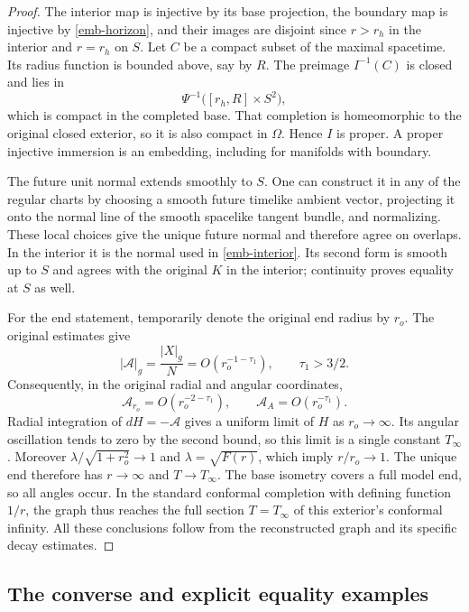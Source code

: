 \begin{proof}
The interior map is injective by its base projection, the boundary
map is injective by \cref{emb-horizon}, and their images are
disjoint since $r>r_h$ in the interior and $r=r_h$ on $S$.
Let $C$ be a compact subset of the maximal spacetime.  Its radius
function is bounded above, say by $R$.  The preimage $I^{-1}(C)$
is closed and lies in
\[
 \Psi^{-1}\bigl([r_h,R]\times S^2\bigr),
\]
which is compact in the completed base.  That completion is
homeomorphic to the original closed exterior, so it is also compact
in $\Omega$.  Hence $I$ is proper.  A proper injective immersion is
an embedding, including for manifolds with boundary.

The future unit normal extends smoothly to $S$.  One can construct
it in any of the regular charts by choosing a smooth future timelike
ambient vector, projecting it onto the normal line of the smooth
spacelike tangent bundle, and normalizing.  These local choices
give the unique future normal and therefore agree on overlaps.
In the interior it is the normal used in \cref{emb-interior}.
Its second form is smooth up to $S$ and agrees with the original
$K$ in the interior; continuity proves equality at $S$ as well.

For the end statement, temporarily denote the original end radius
by $r_o$.  The original estimates give
\[
 |\mathcal A|_g
 =\frac{|X|_g}{N}=O(r_o^{-1-\tau_1}),\qquad
 \tau_1>3/2.
\]
Consequently, in the original radial and angular coordinates,
\[
 \mathcal A_{r_o}=O(r_o^{-2-\tau_1}),\qquad
 \mathcal A_A=O(r_o^{-\tau_1}).
\]
Radial integration of $dH=-\mathcal A$ gives a uniform limit of
$H$ as $r_o\to\infty$.  Its angular oscillation tends to zero by
the second bound, so this limit is a single constant $T_\infty$.
Moreover $\lambda/\sqrt{1+r_o^2}\to1$ and $\lambda=\sqrt{F(r)}$,
which imply $r/r_o\to1$.  The unique end therefore has
$r\to\infty$ and $T\to T_\infty$.  The base isometry covers a
full model end, so all angles occur.  In the standard conformal
completion with defining function $1/r$, the graph thus reaches
the full section $T=T_\infty$ of this exterior's conformal infinity.
All these conclusions follow from the reconstructed graph and its
specific decay estimates.
\end{proof}

\subsection{The converse and explicit equality examples}

